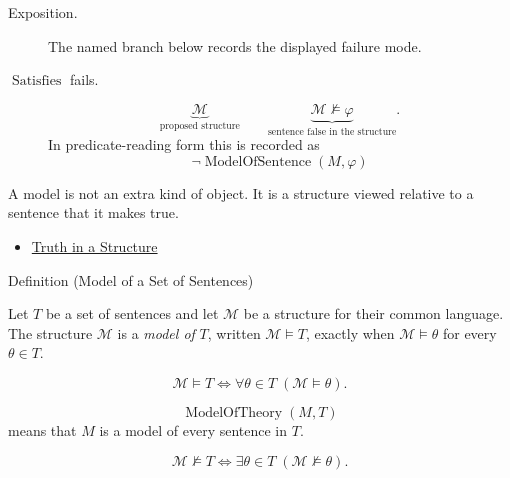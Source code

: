 \begin{remark*}
\begin{description}
  \item[Exposition.] The named branch below records the displayed failure mode.
\item[\(\operatorname{Satisfies}\) fails.] \[
\underbrace{\mathcal M}_{\text{proposed structure}}
\qquad
\underbrace{\mathcal M\not\models\varphi}_{\text{sentence false in the structure}}.
\]
  In predicate-reading form this is recorded as
  \[
    \neg\operatorname{ModelOfSentence}(M,\varphi)
  \]
\end{description}
\end{remark*}

\begin{remark*}[Interpretation]
A model is not an extra kind of object. It is a structure viewed relative to a
sentence that it makes true.
\end{remark*}

\begin{dependencies}
\begin{itemize}
  \item \hyperref[def:truth-structure]{Truth in a Structure}
\end{itemize}
\end{dependencies}

\begin{definitionbox}{Definition (Model of a Set of Sentences)}
\begin{definition}
\label{def:model-theory-set}
Let \(T\) be a set of sentences and let \(\mathcal M\) be a structure for their
common language. The structure \(\mathcal M\) is a \emph{model of} \(T\),
written \(\mathcal M\models T\), exactly when
\(\mathcal M\models\theta\) for every \(\theta\in T\).
\end{definition}
\end{definitionbox}

\begin{remark*}
\[
\mathcal M\models T
\Longleftrightarrow
\forall \theta\in T\;(\mathcal M\models\theta).
\]
\end{remark*}

\begin{remark*}
\[
  \operatorname{ModelOfTheory}(M,T)
\] means that \(M\) is a model of every
sentence in \(T\).
\end{remark*}

\begin{remark*}
\[
\mathcal M\not\models T
\Longleftrightarrow
\exists \theta\in T\;(\mathcal M\not\models\theta).
\]
\end{remark*}

